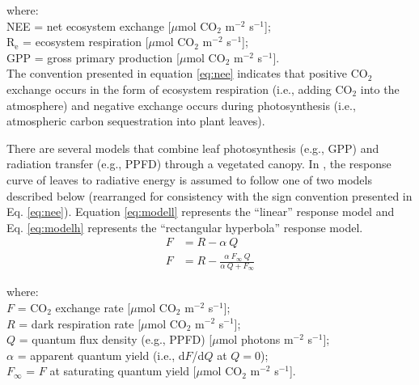 \noindent where:\\
\indent NEE = net ecosystem exchange [$\mu$mol CO$_2$ m$^{-2}$ s$^{-1}$];\\
\indent R$_\text{e}$ = ecosystem respiration [$\mu$mol CO$_2$ m$^{-2}$ s$^{-1}$];\\
\indent GPP = gross primary production [$\mu$mol CO$_2$ m$^{-2}$ s$^{-1}$].\\

\noindent The convention presented in equation \ref{eq:nee} indicates that positive CO$_{2}$ exchange occurs in the form of ecosystem respiration (i.e., adding CO$_{2}$ into the atmosphere) and negative exchange occurs during photosynthesis (i.e., atmospheric carbon sequestration into plant leaves). 

There are several models that combine leaf photosynthesis (e.g., GPP) and radiation transfer (e.g., PPFD) through a vegetated canopy.  
In \parencite{ruimy95}, the response curve of leaves to radiative energy is assumed to follow one of two models described below (rearranged for consistency with the sign convention presented in Eq. \ref{eq:nee}).  
Equation \ref{eq:modell} represents the ``linear'' response model and Eq. \ref{eq:modelh} represents the ``rectangular hyperbola'' response model.
\begin{subequations}
\label{eq:fmodels}
\begin{align}
    F &= R - \alpha\: Q \label{eq:modell} \\
    F &= R - \frac{\alpha\: F_\infty\: Q}
                  {\alpha\: Q + F_\infty}\label{eq:modelh}
\end{align}
\end{subequations}

\noindent where:\\
\indent $F$ = CO$_2$ exchange rate [$\mu$mol CO$_2$ m$^{-2}$ s$^{-1}$];\\
\indent $R$ = dark respiration rate [$\mu$mol CO$_2$ m$^{-2}$ s$^{-1}$];\\
\indent $Q$ = quantum flux density (e.g., PPFD) [$\mu$mol photons m$^{-2}$ s$^{-1}$];\\
\indent $\alpha$ = apparent quantum yield (i.e., d$F$/d$Q$ at $Q=0$);\\
\indent $F_{\infty}$ = $F$ at saturating quantum yield [$\mu$mol CO$_2$ m$^{-2}$ s$^{-1}$].\\


